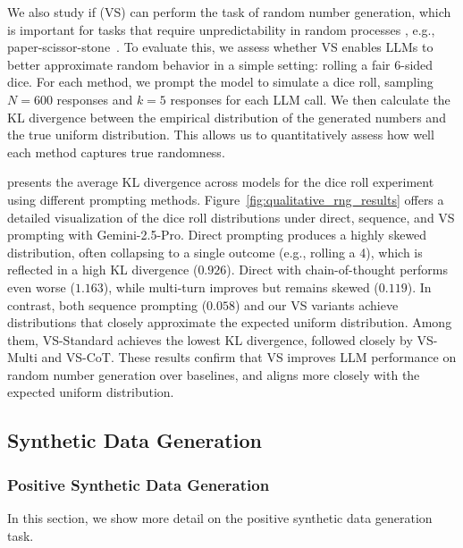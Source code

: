 We also study if \ours (VS) can perform the task of random number generation,  which is important for tasks that require unpredictability in random processes \citep{xiao2025flipping}, e.g., paper-scissor-stone~\citep{west2025basemodelsbeataligned}. 
To evaluate this, we assess whether VS enables LLMs to better approximate random behavior in a simple setting: rolling a fair 6-sided dice. For each method, we prompt the model to simulate a dice roll, sampling $N=600$ responses and $k=5$ responses for each LLM call. We then calculate the KL divergence between the empirical distribution of the generated numbers and the true uniform distribution. This allows us to quantitatively assess how well each method captures true randomness. 

 presents the average KL divergence across models for the dice roll experiment using different prompting methods. Figure~\ref{fig:qualitative_rng_results} offers a  detailed visualization of the dice roll distributions under direct, sequence, and VS prompting with Gemini-2.5-Pro.
Direct prompting produces a highly skewed distribution, often collapsing to a single outcome (e.g., rolling a 4), which is reflected in a high KL divergence ($0.926$). Direct with chain-of-thought performs even worse ($1.163$), while multi-turn improves but remains skewed ($0.119$). In contrast, both sequence prompting ($0.058$) and our VS variants achieve distributions that closely approximate the expected uniform distribution. Among them, VS-Standard achieves the lowest KL divergence, followed closely by VS-Multi and VS-CoT. These results confirm that VS improves LLM performance on random number generation over baselines, and aligns more closely with the expected uniform distribution. %


\newpage
\subsection{Synthetic Data Generation}\label{appendix:synthetic_data}

\subsubsection{Positive Synthetic Data Generation}
\label{appendix:positive_data}

In this section, we show more detail on the positive synthetic data generation task. 


